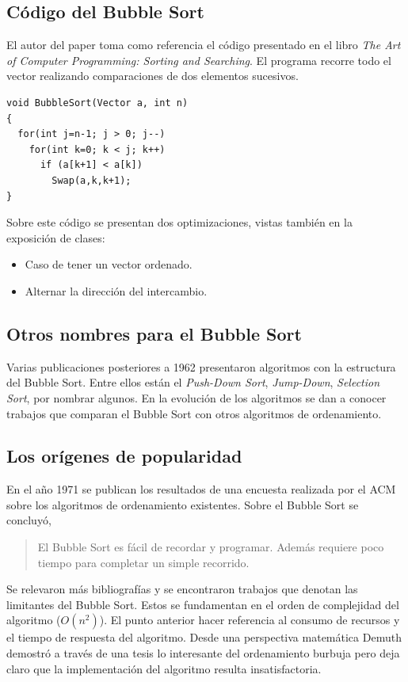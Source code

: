 \documentclass[conference]{IEEEtran}
\begin{document}
\subsection{Código del Bubble Sort}
\label{sec:origen-bubble-sort}

El autor del paper toma como referencia el código presentado en el
libro \emph{The Art of Computer Programming: Sorting and
  Searching}. El programa recorre todo el vector realizando
comparaciones de dos elementos sucesivos.
\begin{verbatim}
void BubbleSort(Vector a, int n)
{
  for(int j=n-1; j > 0; j--)
    for(int k=0; k < j; k++)
      if (a[k+1] < a[k])
        Swap(a,k,k+1);
}
\end{verbatim}

Sobre este código se presentan dos optimizaciones, vistas también en
la exposición de clases:
\begin{itemize}
\item Caso de tener un vector ordenado.
\item Alternar la  dirección del intercambio.
\end{itemize}

\subsection{Otros nombres para el Bubble Sort}
\label{sec:origen-otro-nombre}

Varias publicaciones posteriores a 1962 presentaron algoritmos con la
estructura del Bubble Sort. Entre ellos están el \emph{Push-Down
  Sort}, \emph{Jump-Down}, \emph{Selection Sort}, por nombrar
algunos. En la evolución de los algoritmos se dan a conocer trabajos
que comparan el Bubble Sort con otros algoritmos de ordenamiento.

\subsection{Los orígenes de popularidad}
\label{sec:origen-popu}

En el año 1971 se publican los resultados de una encuesta realizada
por el ACM sobre los algoritmos de ordenamiento existentes. Sobre el
Bubble Sort se concluyó,
\begin{quote}
El Bubble Sort es fácil de recordar y programar. Además requiere poco
tiempo para completar un simple recorrido.   
\end{quote}

Se relevaron más bibliografías y se encontraron trabajos que denotan
las limitantes del Bubble Sort. Estos se fundamentan en el orden de
complejidad del algoritmo ($O(n^2)$). El punto anterior hacer
referencia al consumo de recursos y el tiempo de respuesta del
algoritmo. Desde una perspectiva matemática Demuth demostró a través
de una tesis lo interesante del ordenamiento burbuja pero deja claro
que la implementación del algoritmo resulta insatisfactoria. 
\end{document}
